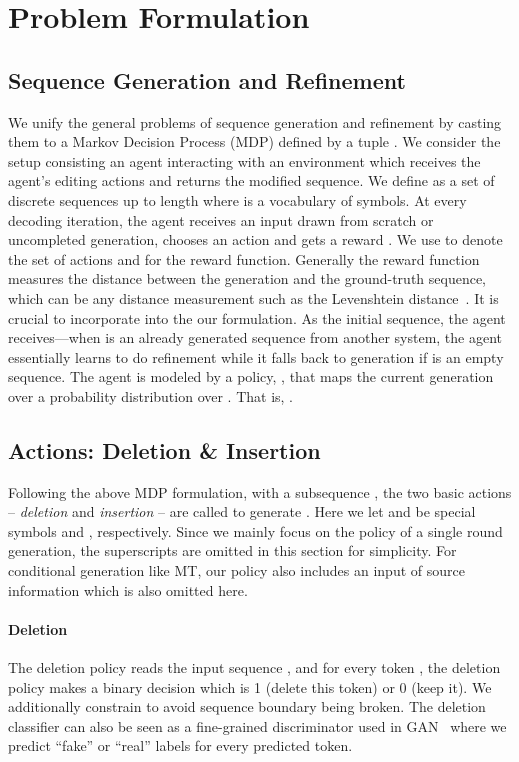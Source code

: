 \documentclass{article}
\begin{document}
\section{Problem Formulation}
\label{sec:formulation}
\subsection{Sequence Generation and Refinement}
We unify the general problems of sequence generation and refinement by casting them to a Markov Decision Process (MDP) defined by a tuple .
We consider the setup consisting an agent interacting with an environment  which receives the agent's editing actions and returns the modified sequence. We define  as a set of discrete sequences up to length  where  is a vocabulary of symbols. 
At every decoding iteration, the agent receives an input  drawn from scratch or uncompleted generation, chooses an action  and gets a reward . We use  to denote the set of actions and  for the reward function. 
Generally the reward function  measures the distance between the generation and the ground-truth sequence,  which can be any distance measurement such as the Levenshtein distance~\citep{levenshtein1965binary}.
It is crucial to incorporate  into the our formulation. As the initial sequence, the agent receives---when  is an already generated sequence from another system, the agent essentially learns to do refinement while it falls back to generation if  is an empty sequence.
The agent is modeled by a policy, , that maps the current generation over a probability distribution over . That is,  . 










\subsection{Actions: Deletion \& Insertion}
Following the above MDP formulation, with a subsequence , the two basic actions -- \textit{deletion} and \textit{insertion} -- are called to generate .
Here we let  and   be special symbols  and , respectively.
Since we mainly focus on the policy of a single round generation, the superscripts are omitted in this section for simplicity. 
For conditional generation like MT, our policy also includes an input of source information  which is also omitted here.

\paragraph{Deletion}
The deletion policy reads the input sequence , and 
for every token , the deletion policy  makes
a binary decision which is 1 (delete this token) or 0 (keep it). 
We additionally constrain  to avoid sequence boundary being broken.
The deletion classifier can also be seen as a fine-grained discriminator used in GAN~\citep{goodfellow2014generative} where we predict ``fake'' or ``real'' labels for every predicted token. 
\end{document}
